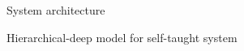 \documentclass{tADR2e}
\begin{document}
\begin{figure}
\begin{center}
\caption{System architecture}

\end{center}
\end{figure}
\begin{figure}
\begin{center}
\caption{Hierarchical-deep model for self-taught system}
\end{center}
\end{figure}
\end{document}
